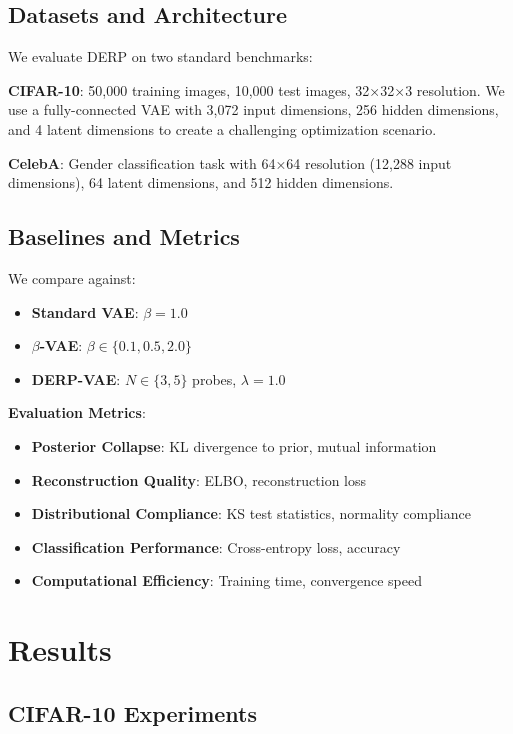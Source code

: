 \documentclass{article}
\begin{document}
\subsection{Datasets and Architecture}

We evaluate DERP on two standard benchmarks:

\textbf{CIFAR-10}: 50,000 training images, 10,000 test images, 32×32×3 resolution. We use a fully-connected VAE with 3,072 input dimensions, 256 hidden dimensions, and 4 latent dimensions to create a challenging optimization scenario.

\textbf{CelebA}: Gender classification task with 64×64 resolution (12,288 input dimensions), 64 latent dimensions, and 512 hidden dimensions.

\subsection{Baselines and Metrics}

We compare against:
\begin{itemize}
    \item \textbf{Standard VAE}: $\beta = 1.0$
    \item \textbf{$\beta$-VAE}: $\beta \in \{0.1, 0.5, 2.0\}$
    \item \textbf{DERP-VAE}: $N \in \{3, 5\}$ probes, $\lambda = 1.0$
\end{itemize}

\textbf{Evaluation Metrics}:
\begin{itemize}
    \item \textbf{Posterior Collapse}: KL divergence to prior, mutual information
    \item \textbf{Reconstruction Quality}: ELBO, reconstruction loss
    \item \textbf{Distributional Compliance}: KS test statistics, normality compliance
    \item \textbf{Classification Performance}: Cross-entropy loss, accuracy
    \item \textbf{Computational Efficiency}: Training time, convergence speed
\end{itemize}

\section{Results}

\subsection{CIFAR-10 Experiments}
\end{document}

